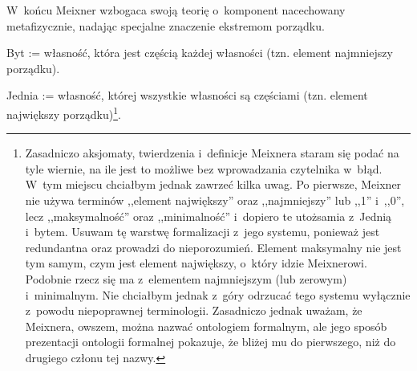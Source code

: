 %
W~końcu Meixner wzbogaca swoją teorię o~komponent nacechowany metafizycznie, nadając specjalne znaczenie ekstremom porządku.
\begin{defin}\label{mei-def1}
Byt := własność, która jest częścią każdej własności (tzn. element najmniejszy porządku).
\end{defin}
\begin{defin}\label{mei-def2}
Jednia := własność, której wszystkie własności są częściami (tzn. element największy porządku)\footnote{\label{przyp-mei-niesc}Zasadniczo aksjomaty, twierdzenia i~definicje Meixnera staram się podać na tyle wiernie, na ile jest to możliwe bez wprowadzania czytelnika w~błąd. W~tym miejscu chciałbym jednak zawrzeć kilka uwag. Po pierwsze, Meixner nie używa terminów ,,element największy'' oraz ,,najmniejszy'' lub ,,1'' i~,,0'', lecz ,,maksymalność'' oraz ,,minimalność'' i~dopiero te utożsamia z~Jednią i~bytem. Usuwam tę warstwę formalizacji z~jego systemu, ponieważ jest redundantna oraz prowadzi do nieporozumień. Element maksymalny nie jest tym samym, czym jest element największy, o~który idzie Meixnerowi. Podobnie rzecz się ma z~elementem najmniejszym (lub zerowym) i~minimalnym. Nie chciałbym jednak z~góry odrzucać tego systemu wyłącznie z~powodu niepoprawnej terminologii. Zasadniczo jednak uważam, że Meixnera, owszem, można nazwać ontologiem formalnym, ale jego sposób prezentacji ontologii formalnej pokazuje, że bliżej mu do pierwszego, niż do drugiego członu tej nazwy.}.
\end{defin}
%
